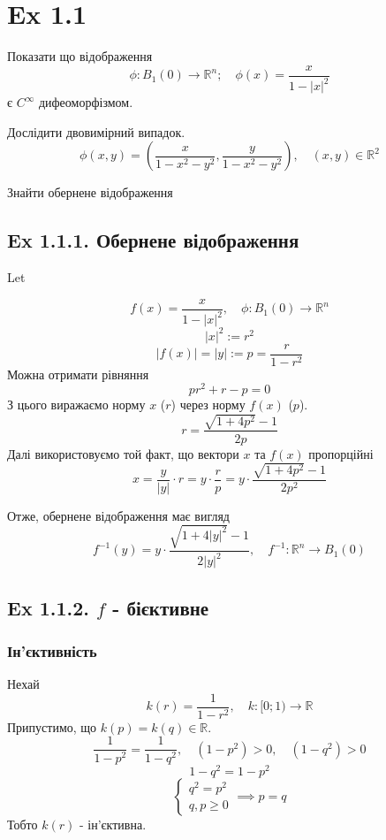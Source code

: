 \documentclass[10pt, a4paper]{article} %
\newcommand{\R}{\mathbb{R}}
\begin{document}
\section*{Ex 1.1}
\begin{mdframed}
    Показати що відображення 
    \[\phi: B_1(0) \to \R^n; \quad \phi(x)=\frac{x}{1-|x|^2}\]
    є $C^\infty$ дифеоморфізмом.

    Дослідити двовимірний випадок.
    \[\phi(x,y) = \left(\frac{x}{1-x^2-y^2}, \frac{y}{1-x^2-y^2}\right), \quad (x,y)\in\R^2\]

    Знайти обернене відображення
\end{mdframed}

\subsection*{Ex 1.1.1. Обернене відображення}

Let 

\[f(x) = \frac{x}{1-|x|^2}, \quad \phi : B_{1}(0) \to \R^n\]
\[|x|^2 := r^2\]
\[|f(x)| = |y| := p = \frac{r}{1-r^2}\]
Можна отримати рівняння
\[pr^2+r-p=0\]
З цього виражаємо норму $x$ ($r$) через норму $f(x)$ ($p$).
\[r = \frac{\sqrt{1+4p^2}-1}{2p}\]
Далі використовуємо той факт, що вектори $x$ та $f(x)$ пропорційні
\[x = \frac{y}{|y|}\cdot r = y \cdot \frac{r}{p} = y \cdot \frac{\sqrt{1+4p^2}-1}{2p^2}\]

\begin{mdframed}[backgroundcolor=green!20]
    Отже, обернене відображення має вигляд
    \[f^{-1}(y) = y \cdot \frac{\sqrt{1+4|y|^2}-1}{2|y|^2}, \quad f^{-1} : \R^n \to B_1(0)\]
\end{mdframed}

\subsection*{Ex 1.1.2. $f$ - бієктивне}
\subsubsection*{Ін'єктивність}

Нехай
\[k(r) = \frac{1}{1-r^2}, \quad k: [0;1) \to \R\]
Припустимо, що $k(p)=k(q) \in \R$.
\[\frac{1}{1-p^2} = \frac{1}{1-q^2}, \quad (1-p^2) > 0, \quad (1-q^2) > 0\]
\[1-q^2 = 1-p^2\]
\[\begin{cases}
    q^2 = p^2 \\
    q,p \ge 0
\end{cases} \implies p=q\]
Тобто $k(r)$ - ін'єктивна.
\end{document}
